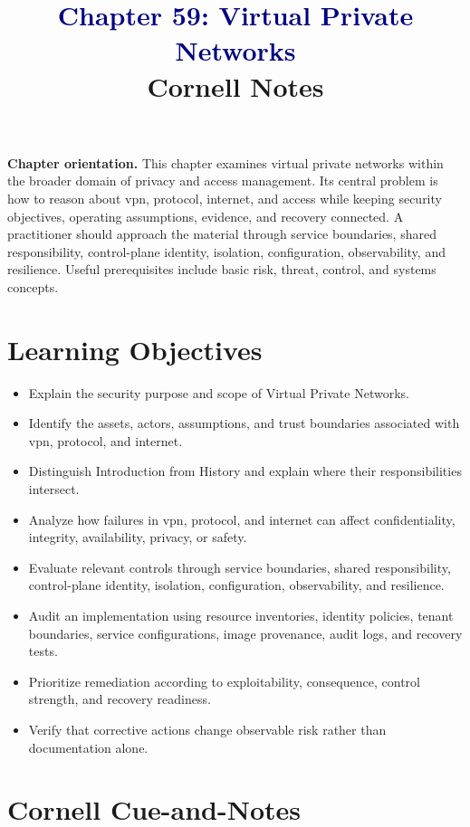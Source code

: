 \documentclass[11pt]{article}
\title{\textcolor{Navy}{Chapter 59: Virtual Private Networks}\\[2mm]\large Cornell Notes}
\author{}
\date{}
\begin{document}
\maketitle
\thispagestyle{fancy}
\vspace{-1.5em}
\begin{orientationbox}
\textbf{Chapter orientation.} This chapter examines virtual private networks within the broader domain of privacy and access management. Its central problem is how to reason about vpn, protocol, internet, and access while keeping security objectives, operating assumptions, evidence, and recovery connected. A practitioner should approach the material through service boundaries, shared responsibility, control-plane identity, isolation, configuration, observability, and resilience. Useful prerequisites include basic risk, threat, control, and systems concepts.
\end{orientationbox}
\section*{Learning Objectives}
\begin{itemize}
\item Explain the security purpose and scope of Virtual Private Networks.
\item Identify the assets, actors, assumptions, and trust boundaries associated with vpn, protocol, and internet.
\item Distinguish Introduction from History and explain where their responsibilities intersect.
\item Analyze how failures in vpn, protocol, and internet can affect confidentiality, integrity, availability, privacy, or safety.
\item Evaluate relevant controls through service boundaries, shared responsibility, control-plane identity, isolation, configuration, observability, and resilience.
\item Audit an implementation using resource inventories, identity policies, tenant boundaries, service configurations, image provenance, audit logs, and recovery tests.
\item Prioritize remediation according to exploitability, consequence, control strength, and recovery readiness.
\item Verify that corrective actions change observable risk rather than documentation alone.
\end{itemize}
\section*{Cornell Cue-and-Notes}
\end{document}
